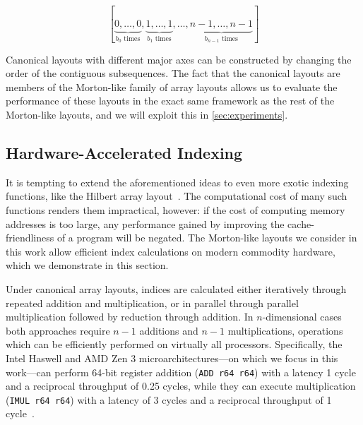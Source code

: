 \begin{equation}
\label{eq:cacnonical_repr}
[\underbrace{0,\ldots,0}_{b_0\text{ times}}, \underbrace{1,\ldots,1}_{b_1\text{ times}}, \ldots, \underbrace{n-1,\ldots,n-1}_{b_{n-1}\text{ times}}]    
\end{equation}

Canonical layouts with different major axes can be constructed by changing the order of the contiguous subsequences. The fact that the canonical layouts are members of the Morton-like family of array layouts allows us to evaluate the performance of these layouts in the exact same framework as the rest of the Morton-like layouts, and we will exploit this in \cref{sec:experiments}. %

\subsection{Hardware-Accelerated Indexing}

\label{sec:bijections:accel}

It is tempting to extend the aforementioned ideas to even more exotic indexing functions, like the Hilbert array layout~\cite{hilbert1891ueber,10.1145/3555353,10.1007/978-3-642-25100-9_73}. The computational cost of many such functions renders them impractical, however: if the cost of computing memory addresses is too large, any performance gained by improving the cache-friendliness of a program will be negated. The Morton-like layouts we consider in this work allow efficient index calculations on modern commodity hardware, which we demonstrate in this section.

Under canonical array layouts, indices are calculated either iteratively through repeated addition and multiplication, or in parallel through parallel multiplication followed by reduction through addition. In $n$-dimensional cases both approaches require $n-1$ additions and $n-1$ multiplications, operations which can be efficiently performed on virtually all processors. Specifically, the Intel Haswell and AMD Zen 3 microarchitectures---on which we focus in this work---can perform 64-bit register addition (\texttt{ADD r64 r64}) with a latency 1 cycle and a reciprocal throughput of 0.25 cycles, while they can execute multiplication (\texttt{IMUL r64 r64}) with a latency of 3 cycles and a reciprocal throughput of 1 cycle~\cite{10.1145/3297858.3304062}.

